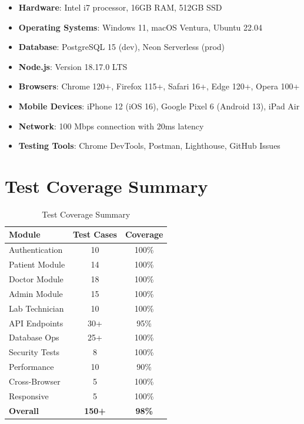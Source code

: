 \begin{itemize}
    \item \textbf{Hardware}: Intel i7 processor, 16GB RAM, 512GB SSD
    \item \textbf{Operating Systems}: Windows 11, macOS Ventura, Ubuntu 22.04
    \item \textbf{Database}: PostgreSQL 15 (dev), Neon Serverless (prod)
    \item \textbf{Node.js}: Version 18.17.0 LTS
    \item \textbf{Browsers}: Chrome 120+, Firefox 115+, Safari 16+, Edge 120+, Opera 100+
    \item \textbf{Mobile Devices}: iPhone 12 (iOS 16), Google Pixel 6 (Android 13), iPad Air
    \item \textbf{Network}: 100 Mbps connection with 20ms latency
    \item \textbf{Testing Tools}: Chrome DevTools, Postman, Lighthouse, GitHub Issues
\end{itemize}

\section{Test Coverage Summary}

\begin{table}[H]
    \centering
    \small
    \setlength{\tabcolsep}{3pt}
    \begin{tabular}{|l|c|c|}
        \hline
        \textbf{Module} & \textbf{Test Cases} & \textbf{Coverage} \\
        \hline
        Authentication & 10 & 100\% \\
        \hline
        Patient Module & 14 & 100\% \\
        \hline
        Doctor Module & 18 & 100\% \\
        \hline
        Admin Module & 15 & 100\% \\
        \hline
        Lab Technician & 10 & 100\% \\
        \hline
        API Endpoints & 30+ & 95\% \\
        \hline
        Database Ops & 25+ & 100\% \\
        \hline
        Security Tests & 8 & 100\% \\
        \hline
        Performance & 10 & 90\% \\
        \hline
        Cross-Browser & 5 & 100\% \\
        \hline
        Responsive & 5 & 100\% \\
        \hline
        \textbf{Overall} & \textbf{150+} & \textbf{98\%} \\
        \hline
    \end{tabular}
    \caption{Test Coverage Summary}
    \label{tab:coverage}
\end{table}

